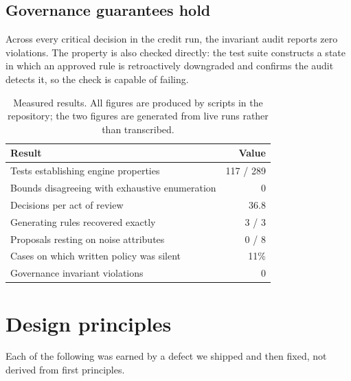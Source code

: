 \documentclass[sigconf,nonacm]{acmart}
\begin{document}
\subsection{Governance guarantees hold}

Across every critical decision in the credit run, the invariant audit reports
zero violations. The property is also checked directly: the test suite
constructs a state in which an approved rule is retroactively downgraded and
confirms the audit detects it, so the check is capable of failing.

\begin{table}[t]
  \caption{Measured results. All figures are produced by scripts in the
  repository; the two figures are generated from live runs rather than
  transcribed.}
  \label{tab:results}
  \begin{tabular}{lr}
    \toprule
    \textbf{Result} & \textbf{Value} \\
    \midrule
    Tests establishing engine properties & 117 / 289 \\
    Bounds disagreeing with exhaustive enumeration & 0 \\
    Decisions per act of review & 36.8 \\
    Generating rules recovered exactly & 3 / 3 \\
    Proposals resting on noise attributes & 0 / 8 \\
    Cases on which written policy was silent & 11\% \\
    Governance invariant violations & 0 \\
    \bottomrule
  \end{tabular}
\end{table}

\section{Design principles}

Each of the following was earned by a defect we shipped and then fixed, not
derived from first principles.
\end{document}
